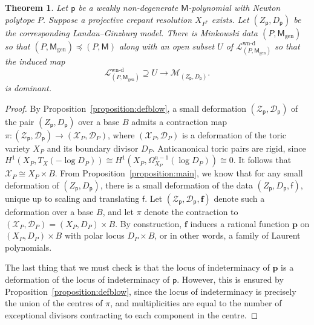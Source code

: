 \documentclass[10pt]{amsart}
\numberwithin{equation}{section}
\theoremstyle{plain}
\newtheorem{theorem}{Theorem}[section]
\theoremstyle{definition}
\theoremstyle{remark}
\DeclareMathOperator{\gen}{gen}
\begin{document}
\begin{theorem}\label{theorem:defmink}
  Let \(\mathsf{p}\) be a weakly non-degenerate \(\mathsf{M}\)-polynomial with Newton polytope \(P\). Suppose a projective crepant resolution \(X_{P^*}\) exists. Let \((Z_\mathsf{p},D_\mathsf{p})\) be the corresponding Landau--Ginzburg model. There is Minkowski data \((P,\mathsf{M}_{\gen})\) so that \((P,\mathsf{M}_{\gen})\preceq (P,\mathsf{M})\) along with an open subset \(U\) of \(\mathcal{L}_{(P,\mathsf{M}_{\gen})}^\text{wn-d}\) so that the induced map
  \[
    \mathcal{L}^{\text{wn-d}}_{(P,\mathsf{M}_{\gen})}\supseteq U \rightarrow \mathcal{M}_{(Z_\mathsf{p},D_\mathsf{p})}.
  \]
  is dominant.
\end{theorem}

\begin{proof}
  By Proposition~\ref{proposition:defblow}, a small deformation \((\mathscr{Z}_\mathsf{p},\mathscr{D}_\mathsf{p})\)  of the pair \((Z_\mathsf{p},D_\mathsf{p})\) over a base \(B\) admits a contraction map \(\pi \colon (\mathscr{Z}_\mathsf{p},\mathscr{D}_\mathsf{p}) \rightarrow (\mathscr{X}_P,\mathscr{D}_P)\), where \((\mathscr{X}_P,\mathscr{D}_P)\) is a deformation of the toric variety \(X_P\) and its boundary divisor \(D_P\). Anticanonical toric pairs are rigid, since \(H^1(X_P,T_X(-\log D_P )) \cong H^1(X_P,\Omega^{n-1}_{X_P}(\log D_P)) \cong 0\). It follows that \(\mathscr{X}_P  \cong X_P \times B\). From Proposition~\ref{proposition:main}, we know that for any small deformation of \((Z_\mathsf{p},D_\mathsf{p})\), there is a small deformation of the data \((Z_\mathsf{p},D_\mathsf{p},\mathsf{f})\), unique up to scaling and translating \(\mathsf{f}\). Let \((\mathscr{Z}_\mathsf{p},\mathscr{D}_\mathsf{p},{\bm f})\) denote such a deformation over a base \(B\), and let \(\pi\) denote the contraction to \((\mathscr{X}_P,\mathscr{D}_P) = (X_P, D_P)\times B\). By construction, \({\bm f}\) induces a rational function \({\bm p}\) on \((X_P,D_P)\times B\) with polar locus \(D_P \times B\), or in other words, a family of Laurent polynomials.

  The last thing that we must check is that the locus of indeterminacy of \({\bm p}\) is a deformation of the locus of indeterminacy of \(\mathsf{p}\). However, this is ensured by Proposition~\ref{proposition:defblow}, since the locus of indeterminacy is precisely the union of the centres of \(\pi\), and multiplicities are equal to the number of exceptional divisors contracting to each component in the centre.
\end{proof}
\end{document}
